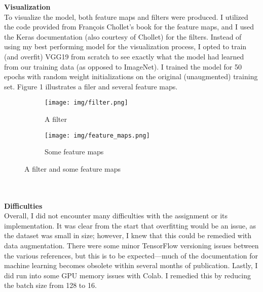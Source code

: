 \documentclass[12pt, letterpaper, onecolumn]{article}
\begin{document}
\vspace{0.125in}
\noindent\textbf{Visualization}\\

\indent To visualize the model, both feature maps and filters were produced. I utilized the code provided from François Chollet's book \cite{chollet} for the feature maps, and I used the Keras documentation \cite{filters} (also courtesy of Chollet) for the filters. Instead of using my best performing model for the visualization process, I opted to train (and overfit) VGG19 from scratch to see exactly what the model had learned from our training data (as opposed to ImageNet). I trained the model for 50 epochs with random weight initializations on the original (unaugmented) training set. Figure 1 illustrates a filer and several feature maps.\\


\begin{figure}[h]
\centering
\begin{subfigure}{.5\textwidth}
  \centering
  \texttt{[image: img/filter.png]}
  \caption{A filter}
  \label{fig:sub1}
\end{subfigure}%
\begin{subfigure}{.5\textwidth}
  \centering
  \texttt{[image: img/feature\_maps.png]}
  \caption{Some feature maps}
  \label{fig:sub2}
\end{subfigure}
\caption{A filter and some feature maps}
\label{fig:test}
\end{figure}

\vspace{0.125in}
\noindent\textbf{\\\\Difficulties}\\
\indent Overall, I did not encounter many difficulties with the assignment or its implementation. It was clear from the start that overfitting would be an issue, as the dataset was small in size; however, I knew that this could be remedied with data augmentation. There were some minor TensorFlow versioning issues between the various references, but this is to be expected—much of the documentation for machine learning becomes obsolete within several months of publication. Lastly, I did run into some GPU memory issues with Colab. I remedied this by reducing the batch size from 128 to 16.
\end{document}
